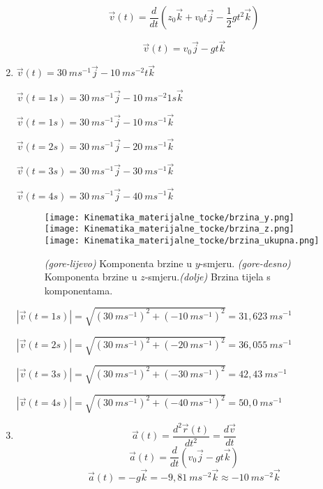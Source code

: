 \begin{enumerate}[label=\alph*)]
 $$\vec{v}(t)  = \frac{d}{dt} \left(z_0 \vec{k}+v_0t \vec{j}-\frac{1}{2}gt^2\vec{k}  \right)$$

 $$\vec{v}(t)  = v_0\vec{j}-gt\vec{k}$$
 
 \item $\vec{v}(t)  =30\ ms^{-1}\vec{j}-10\ ms^{-2}t\vec{k}$
 
 $\vec{v}(t=1s)  =30\ ms^{-1}\vec{j}-10\ ms^{-2}1s\vec{k}$
 
 $\vec{v}(t=1s)  =30\ ms^{-1}\vec{j}-10\ ms^{-1}\vec{k}$
 
 $\vec{v}(t=2s)  =30\ ms^{-1}\vec{j}-20\ ms^{-1}\vec{k}$
 
 $\vec{v}(t=3s)  =30\ ms^{-1}\vec{j}-30\ ms^{-1}\vec{k}$
  
 $\vec{v}(t=4s)  =30\ ms^{-1}\vec{j}-40\ ms^{-1}\vec{k}$
 
\begin{figure}
  \centering
  \texttt{[image: Kinematika\_materijalne\_tocke/brzina\_y.png]}
  \centering
  \texttt{[image: Kinematika\_materijalne\_tocke/brzina\_z.png]}
\centering
  \texttt{[image: Kinematika\_materijalne\_tocke/brzina\_ukupna.png]}
\caption{\textit{(gore-lijevo)} Komponenta brzine u $y$-smjeru. \textit{(gore-desno)} Komponenta brzine u $z$-smjeru.\textit{(dolje)} Brzina tijela s komponentama.}
\end{figure}

$|\vec{v}(t=1s)|  = \sqrt{ (30\ ms^{-1})^2 + (-10\ ms^{-1})^2 } = 31,623\ ms^{-1} $

$|\vec{v}(t=2s)|  = \sqrt{ (30\ ms^{-1})^2 + (-20\ ms^{-1})^2 } = 36,055\ ms^{-1}  $

$|\vec{v}(t=3s)|  = \sqrt{ (30\ ms^{-1})^2 + (-30\ ms^{-1})^2 } = 42,43\ ms^{-1}  $

$|\vec{v}(t=4s)|  = \sqrt{ (30\ ms^{-1})^2 + (-40\ ms^{-1})^2 } = 50,0\ ms^{-1}  $


\item $$\vec{a}(t)  = \frac{d^2\vec{r}(t)}{dt^2}=\frac{d\vec{v}}{dt}$$
$$\vec{a}(t)  = \frac{d} {dt} \left( v_0\vec{j}-gt\vec{k}  \right)$$
$$ \vec{a}(t)  =  -g\vec{k}=-9,81\ ms^{-2}\vec{k}\approx -10\ ms^{-2}\vec{k} $$

\end{enumerate}
